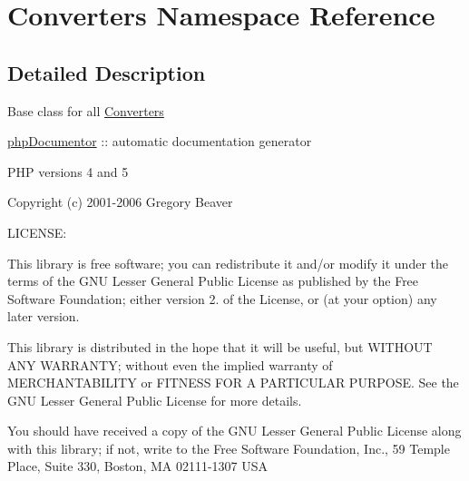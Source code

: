 \hypertarget{namespace_converters}{\section{\-Converters \-Namespace \-Reference}
\label{namespace_converters}
}


\subsection{\-Detailed \-Description}
\-Base class for all \hyperlink{namespace_converters}{\-Converters}

\hyperlink{namespacephp_documentor}{php\-Documentor} \-:\-: automatic documentation generator

\-P\-H\-P versions 4 and 5

\-Copyright (c) 2001-\/2006 \-Gregory \-Beaver

\-L\-I\-C\-E\-N\-S\-E\-:

\-This library is free software; you can redistribute it and/or modify it under the terms of the \-G\-N\-U \-Lesser \-General \-Public \-License as published by the \-Free \-Software \-Foundation; either version 2. of the \-License, or (at your option) any later version.

\-This library is distributed in the hope that it will be useful, but \-W\-I\-T\-H\-O\-U\-T \-A\-N\-Y \-W\-A\-R\-R\-A\-N\-T\-Y; without even the implied warranty of \-M\-E\-R\-C\-H\-A\-N\-T\-A\-B\-I\-L\-I\-T\-Y or \-F\-I\-T\-N\-E\-S\-S \-F\-O\-R \-A \-P\-A\-R\-T\-I\-C\-U\-L\-A\-R \-P\-U\-R\-P\-O\-S\-E. \-See the \-G\-N\-U \-Lesser \-General \-Public \-License for more details.

\-You should have received a copy of the \-G\-N\-U \-Lesser \-General \-Public \-License along with this library; if not, write to the \-Free \-Software \-Foundation, \-Inc., 59 \-Temple \-Place, \-Suite 330, \-Boston, \-M\-A 02111-\/1307 \-U\-S\-A

